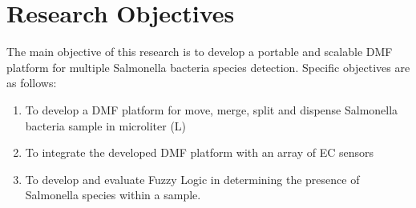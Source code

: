 \section{Research Objectives}
The main objective of this research is to develop a portable and scalable DMF platform for multiple Salmonella bacteria species detection. Specific objectives are as follows:
\begin{enumerate}
    \item To develop a DMF platform for move, merge, split and dispense Salmonella bacteria sample in microliter (\textmugreek L)
    \item To integrate the developed DMF platform with an array of EC sensors
    \item To develop and evaluate Fuzzy Logic in determining the presence of Salmonella species within a sample.
\end{enumerate}
\newpage
